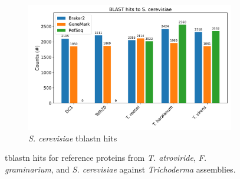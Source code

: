\begin{figure}[htp]\ContinuedFloat
  \centering
  \begin{subfigure}[b]{0.85\textwidth}
    \includegraphics[width=\textwidth]{figures/blast-scerevisiae.pdf}
    \caption{\textit{S. cerevisiae} tblastn hits}
    \label{fig:blast-scerevisiae}
  \end{subfigure}
  \caption{tblastn hits for reference proteins from \textit{T. atroviride}, \textit{F. graminarium}, and \textit{S. cerevisiae} against \textit{Trichoderma} assemblies.}
  \label{fig:blast-hits}
\end{figure}

